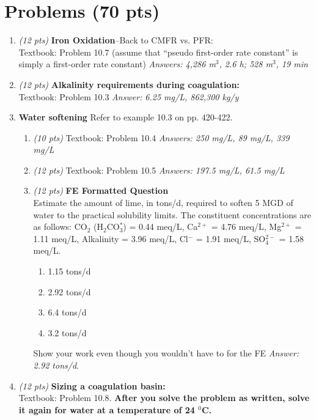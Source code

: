\documentclass[12pt,letterpaper]{article}
\begin{document}
\section *{Problems (70 pts)}
\begin{enumerate}
\item \emph{(12 pts)} \textbf{Iron Oxidation}--Back to CMFR vs. PFR:\\
Textbook: Problem 10.7 (assume that ``pseudo first-order rate constant'' is simply a first-order rate constant)
\emph{Answers: 4,286 m$^3$, 2.6 h; 528 m$^3$, 19 min}

\item \emph{(12 pts)} \textbf{Alkalinity requirements during coagulation:}\\
Textbook: Problem 10.3 \emph{Answer: 6.25 mg/L, 862,300 kg/y}

\item  \textbf{Water softening} Refer to example 10.3 on pp. 420-422. 
\begin{enumerate}

\item \emph{(10 pts)} Textbook: Problem 10.4 \emph{Answers: 250 mg/L, 89 mg/L, 339 mg/L}

\item \emph{(12 pts)} Textbook: Problem 10.5 \emph{Answers: 197.5 mg/L, 61.5 mg/L}

\item \emph{(12 pts)} \textbf{FE Formatted Question}\\Estimate the amount of lime, in tons/d, required to soften 5 MGD of water to the practical solubility limits.  The constituent concentrations are as follows: CO$_2$ (H$_2$CO$_3^*$) = 0.44 meq/L, Ca$^{2+}$ = 4.76 meq/L, Mg$^{2+}$ = 1.11 meq/L, Alkalinity = 3.96 meq/L, Cl$^-$ = 1.91 meq/L, SO$_4^{2-}$ = 1.58 meq/L.

\begin{enumerate}
\item 1.15 tons/d
\item 2.92 tons/d
\item 6.4 tons/d
\item 3.2 tons/d
\end{enumerate}
Show your work even though you wouldn't have to for the FE \emph{Answer: 2.92 tons/d}.



\end{enumerate}


  


\item \emph{(12 pts)} \textbf{Sizing a coagulation basin:}\\
Textbook: Problem 10.8.  \textbf{After you solve the problem as written, solve it again for water at a temperature of 24 $^0$C.} 

 













\end{enumerate}
\end{document}
